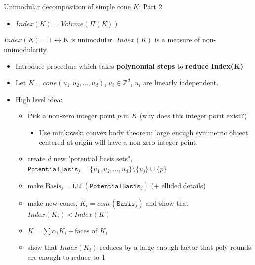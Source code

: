 \documentclass[8pt]{beamer}
\begin{document}
\begin{frame}[label=sec-14]{Unimodular decomposition of simple cone $K$: Part 2}
\begin{itemize}
\item $Index(K) = Volume(\Pi(K))$
\end{itemize}

$Index(K) = 1 \leftrightarrow \text{K is unimodular}$. $Index(K)$ is a measure of non-unimodularity.

\begin{itemize}
\item Introduce procedure which takes \textbf{polynomial steps} to \textbf{reduce Index(K)}
\item Let $K = cone(u_1, u_2, \ldots, u_d)$, $u_i \in \mathbb{Z}^d$, $u_i$ are linearly independent.
\item High level idea:
\begin{itemize}
\item Pick a non-zero integer point $p$ in $K$ (why does this integer point exist?)
\begin{itemize}
\item Use minkowski convex body theorem: large enough symmetric object centered at origin will have a non zero integer point.
\end{itemize}
\item create $d$ new "potential basis sets", $\texttt{PotentialBasis}_j = \{u_1, u_2 , \ldots, u_d\} \setminus \{u_j\} \cup \{p\}$
\item make $\text{Basis}_j = \texttt{LLL}(\texttt{PotentialBasis}_j)$  (+ ellided details)
\item make new cones, $K_i = cone(\texttt{Basis}_j)$ and show that $Index(K_i) < Index(K)$
\item $K = \sum \alpha_i K_i + \text{faces of \(K_i \)}$
\item show that $Index(K_i)$ reduces by a large enough factor that poly rounds are enough to reduce to 1
\end{itemize}
\end{itemize}
\end{frame}
\end{document}
